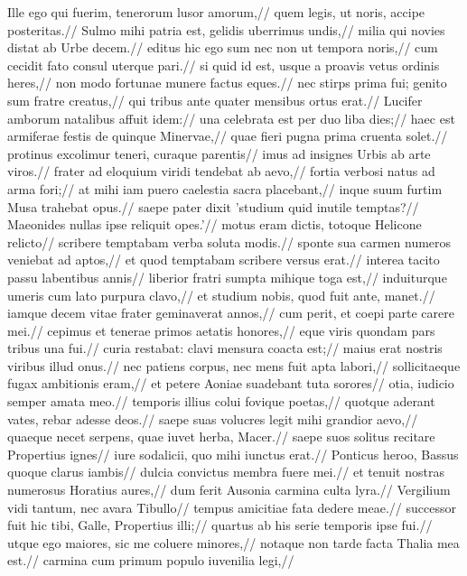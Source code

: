 Ille ego qui fuerim, tenerorum lusor amorum,//
     quem legis, ut noris, accipe posteritas.//
Sulmo mihi patria est, gelidis uberrimus undis,//
     milia qui novies distat ab Urbe decem.//
editus hic ego sum nec non ut tempora noris,//
     cum cecidit fato consul uterque pari.//
si quid id est, usque a proavis vetus ordinis heres,//
     non modo fortunae munere factus eques.//
nec stirps prima fui; genito sum fratre creatus,//
     qui tribus ante quater mensibus ortus erat.//
Lucifer amborum natalibus affuit idem://
     una celebrata est per duo liba dies;//
haec est armiferae festis de quinque Minervae,//
     quae fieri pugna prima cruenta solet.//
protinus excolimur teneri, curaque parentis//
     imus ad insignes Urbis ab arte viros.//
frater ad eloquium viridi tendebat ab aevo,//
     fortia verbosi natus ad arma fori;//
at mihi iam puero caelestia sacra placebant,//
     inque suum furtim Musa trahebat opus.//
saepe pater dixit 'studium quid inutile temptas?//
     Maeonides nullas ipse reliquit opes.'//
motus eram dictis, totoque Helicone relicto//
     scribere temptabam verba soluta modis.//
sponte sua carmen numeros veniebat ad aptos,//
     et quod temptabam scribere versus erat.//
interea tacito passu labentibus annis//
     liberior fratri sumpta mihique toga est,//
induiturque umeris cum lato purpura clavo,//
     et studium nobis, quod fuit ante, manet.//
iamque decem vitae frater geminaverat annos,//
     cum perit, et coepi parte carere mei.//
cepimus et tenerae primos aetatis honores,//
     eque viris quondam pars tribus una fui.//
curia restabat: clavi mensura coacta est;//
     maius erat nostris viribus illud onus.//
nec patiens corpus, nec mens fuit apta labori,//
     sollicitaeque fugax ambitionis eram,//
et petere Aoniae suadebant tuta sorores//
     otia, iudicio semper amata meo.//
temporis illius colui fovique poetas,//
     quotque aderant vates, rebar adesse deos.//
saepe suas volucres legit mihi grandior aevo,//
     quaeque necet serpens, quae iuvet herba, Macer.//
saepe suos solitus recitare Propertius ignes//
     iure sodalicii, quo mihi iunctus erat.//
Ponticus heroo, Bassus quoque clarus iambis//
     dulcia convictus membra fuere mei.//
et tenuit nostras numerosus Horatius aures,//
     dum ferit Ausonia carmina culta lyra.//
Vergilium vidi tantum, nec avara Tibullo//
     tempus amicitiae fata dedere meae.//
successor fuit hic tibi, Galle, Propertius illi;//
     quartus ab his serie temporis ipse fui.//
utque ego maiores, sic me coluere minores,//
     notaque non tarde facta Thalia mea est.//
carmina cum primum populo iuvenilia legi,//
